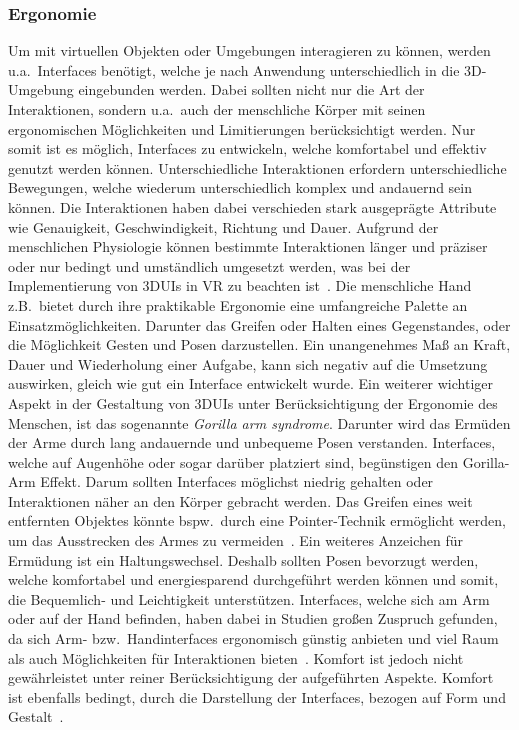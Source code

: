 \subsubsection{Ergonomie}
Um mit virtuellen Objekten oder Umgebungen interagieren zu können, werden u.a.~Interfaces benötigt, welche je nach Anwendung unterschiedlich in die 3D-Umgebung eingebunden werden. Dabei sollten nicht nur die Art der Interaktionen, sondern u.a.~auch der menschliche Körper mit seinen ergonomischen Möglichkeiten und Limitierungen berücksichtigt werden.
Nur somit ist es möglich, Interfaces zu entwickeln, welche komfortabel und effektiv genutzt werden können. Unterschiedliche Interaktionen erfordern unterschiedliche Bewegungen, welche wiederum unterschiedlich komplex und andauernd sein können. Die Interaktionen haben dabei verschieden stark ausgeprägte Attribute wie Genauigkeit, Geschwindigkeit, Richtung und Dauer. Aufgrund der menschlichen Physiologie können bestimmte Interaktionen län\-ger und präziser oder nur bedingt und umständlich umgesetzt werden, was bei der Implementierung von 3DUIs in VR zu beachten ist~\cite{theoryandpracticebook}. Die menschliche Hand z.B.~bietet durch ihre praktikable Ergonomie eine umfangreiche Palette an Einsatzmöglichkeiten. Darunter das Greifen oder Halten eines Gegenstandes, oder die Möglichkeit Gesten und Posen darzustellen. Ein unangenehmes Maß an Kraft, Dauer und Wiederholung einer Aufgabe, kann sich negativ auf die Umsetzung auswirken, gleich wie gut ein Interface entwickelt wurde. Ein weiterer wichtiger Aspekt in der Gestaltung von 3DUIs unter Berücksichtigung der Ergonomie des Menschen, ist das sogenannte \textit{Gorilla arm syndrome}. Darunter wird das Ermüden der Arme durch lang andauernde und unbequeme Posen verstanden. Interfaces, welche auf Augenhöhe oder sogar darüber platziert sind, begünstigen den Gorilla-Arm Effekt. Darum sollten Interfaces möglichst niedrig gehalten oder Interaktionen näher an den Körper gebracht werden. Das Greifen eines weit entfernten Objektes könnte bspw.~durch eine Pointer-Technik ermöglicht werden, um das Ausstrecken des Armes zu vermeiden~\cite{theoryandpracticebook,consumedindurance}. Ein weiteres Anzeichen für Ermüdung ist ein Haltungswechsel. Deshalb sollten Posen bevorzugt werden, welche komfortabel und energiesparend durchgeführt werden können und somit, die Bequemlich- und Leichtigkeit unterstützen. Interfaces, welche sich am Arm oder auf der Hand befinden, haben dabei in Studien großen Zuspruch gefunden, da sich Arm- bzw.~Handinterfaces ergonomisch günstig anbieten und viel Raum als auch Möglichkeiten für Interaktionen bieten~\cite{implicationsoflocation}.
Komfort ist jedoch nicht gewährleistet unter reiner Berücksichtigung der aufgeführten Aspekte. Komfort ist ebenfalls bedingt, durch die Darstellung der Interfaces, bezogen auf Form und Gestalt~\cite{theoryandpracticebook}.

